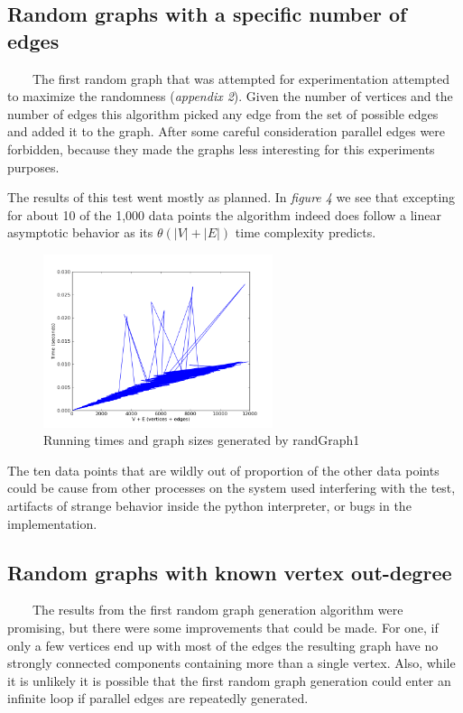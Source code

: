 \documentclass[12pt]{article}
\begin{document}
  \subsection{Random graphs with a specific number of edges}
  \ \ \ \ The first random graph that was attempted for experimentation attempted to maximize the randomness (\emph{appendix 2}). Given the number of vertices and the number of edges this algorithm picked any edge from the set of possible edges and added it to the graph. After some careful consideration parallel edges were forbidden, because they made the graphs less interesting for this experiments purposes.
  
  The results of this test went mostly as planned. In \emph{figure 4} we see that excepting for about 10 of the 1,000 data points the algorithm indeed does follow a linear asymptotic behavior as its $ \theta(|V| + |E|) $ time complexity predicts.
  
  \begin{figure}[h!]
    \centering
      \includegraphics[width=0.6\textwidth]{GibsondirectedGraph.png}
        \caption{Running times and graph sizes generated by randGraph1}
\end{figure} 

  The ten data points that are wildly out of proportion of the other data points could be cause from other processes on the system used interfering with the test, artifacts of strange behavior inside the python interpreter, or bugs in the implementation. 
  
  \subsection{Random graphs with known vertex out-degree}
  \ \ \ \ The results from the first random graph generation algorithm were promising, but there were some improvements that could be made. For one, if only a few vertices end up with most of the edges the resulting graph have no strongly connected components containing more than a single vertex. Also, while it is unlikely it is possible that the first random graph generation could enter an infinite loop if parallel edges are repeatedly generated.
  
\end{document}
